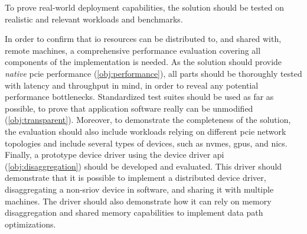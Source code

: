 \begin{objective}\label{obj:experiments}
    To prove real-world deployment capabilities, the solution should be tested on realistic and relevant workloads and benchmarks.
\end{objective}
In order to confirm that \gls{io} resources can be distributed to, and shared with, remote machines, a comprehensive performance evaluation covering all components of the implementation is needed.
%
As the solution should provide \emph{native} \gls{pcie} performance (\cref{obj:performance}), all parts should be thoroughly tested with latency and throughput in mind, in order to reveal any potential performance bottlenecks.
Standardized test suites should be used as far as possible, to prove that application software really can be unmodified (\cref{obj:transparent}).
%
Moreover, to demonstrate the completeness of the solution, the evaluation should also include workloads relying on different \gls{pcie} network topologies and include several types of devices, such as \glspl{nvme}, \glspl{gpu}, and \glspl{nic}.
%
Finally, a prototype device driver using the device driver \gls{api} (\cref{obj:disaggregation}) should be developed and evaluated. 
%
This driver should demonstrate that it is possible to implement a distributed device driver, \gls{disaggregating} a non-\gls{sriov} device in software, and sharing it with multiple machines. 
%
The driver should also demonstrate how it can rely on memory \gls{disaggregation} and shared memory capabilities to implement data path optimizations.



